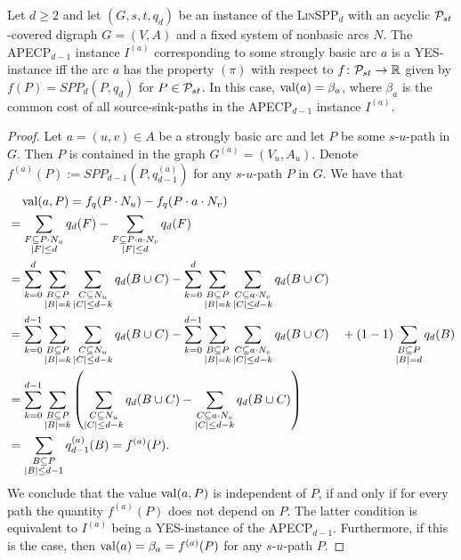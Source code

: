 \begin{lemma}
\label{lemma:corresponding-instance}
Let $d \geq 2$ and let  $(G, s,t, q_d)$ be an instance of the \textsc{Lin}SPP$_d$ with an acyclic  $\mathcal{P}_{st}$-covered digraph $G=(V,A)$ and a fixed system of nonbasic arcs  $N$. 
The APECP$_{d-1}$ instance $I^{(a)}$ corresponding to some strongly basic arc $a$ is a \textsc{YES}-instance iff the arc $a$ has the property $(\pi)$ with respect to $f\colon \mathcal{P}_{st}\to\mathbb{R}$ given by $f(P)=SPP_d(P,q_d)$ for $P\in \mathcal{P}_{st}$. In this case, $\operatorname{val}(a) = \beta_a$, where $\beta_a$ is the common cost of all source-sink-paths in the APECP$_{d-1}$ instance $I^{(a)}$.
\end{lemma}
\begin{proof}
Let $a = (u,v) \in A$ be a strongly basic arc and let $P$ be some $s$-$u$-path in $G$. Then $P$ is  contained in the graph $G^{(a)} = (V_u, A_u)$. 
Denote $f^{(a)}(P):=SPP_{d-1}(P,q^{(a)}_{d-1})$ for any $s$-$u$-path $P$ in $G$. We have that
\begin{align*}
    &\quad \operatorname{val}(a, P) = f_q(P \cdot N_u) - f_q(P \cdot a \cdot N_v) \\
    &= \sum_{\substack{F \subseteq P \cdot N_u\\ |F| \leq d}}q_d(F) - \sum_{\substack{F \subseteq P \cdot a \cdot N_v\\ |F| \leq d}}q_d(F)\\
    &= \sum_{k=0}^d \sum_{\substack{B \subseteq P\\ |B| = k}}\sum_{\substack{C \subseteq N_u\\ |C| \leq d - k}}q_d(B \cup C) - \sum_{k=0}^d \sum_{\substack{B \subseteq P\\ |B| = k}}\sum_{\substack{C \subseteq a \cdot N_v\\ |C| \leq d - k}}q_d(B \cup C)\\
    &= \sum_{k=0}^{d-1} \sum_{\substack{B \subseteq P\\ |B| = k}}\sum_{\substack{C \subseteq N_u\\ |C| \leq d - k}}q_d(B \cup C) - \sum_{k=0}^{d-1} \sum_{\substack{B \subseteq P\\ |B| = k}}\sum_{\substack{C \subseteq a \cdot N_v\\ |C| \leq d - k}}q_d(B \cup C) \quad +  (1 - 1)\sum_{\substack{B \subseteq P\\ |B| = d}}q_d(B)\\
     &= \sum_{k=0}^{d-1} \sum_{\substack{B \subseteq P\\ |B| = k}}\left(\sum_{\substack{C \subseteq N_u\\ |C| \leq d - k}}q_d(B \cup C) - \sum_{\substack{C \subseteq a \cdot N_v\\ |C| \leq d - k}}q_d(B \cup C)
     \right)\\
     &= \sum_{\substack{B \subseteq P\\ |B| \leq d-1}}q^{(a)}_{d-1}(B) = f^{(a)}(P).
\end{align*}
We conclude that the value $\operatorname{val}(a, P)$ is independent of $P$, if and only if for every path the quantity $f^{(a)}(P)$ does not depend on $P$. The latter condition is equivalent to  $I^{(a)}$  being a \textsc{YES}-instance of the APECP$_{d-1}$. Furthermore, if this is the case, then $\operatorname{val}(a) =\beta_a= f^{(a)}(P)$ for any $s$-$u$-path $P$.
\end{proof}
